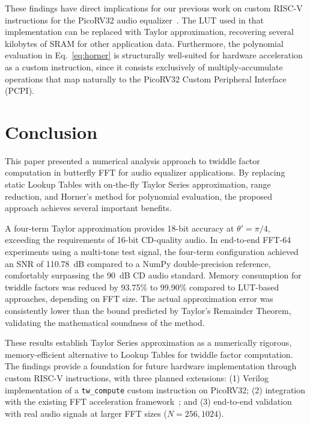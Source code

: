 \documentclass[conference]{IEEEtran}
\begin{document}
These findings have direct implications for our previous work on custom RISC-V
instructions for the PicoRV32 audio equalizer~\cite{qohar2026picorv32}. The
LUT used in that implementation can be replaced with Taylor approximation,
recovering several kilobytes of SRAM for other application data. Furthermore,
the polynomial evaluation in Eq.~\eqref{eq:horner} is structurally well-suited
for hardware acceleration as a custom instruction, since it consists exclusively
of multiply-accumulate operations that map naturally to the PicoRV32 Custom
Peripheral Interface (PCPI).


\section{Conclusion}
\label{sec:conclusion}

This paper presented a numerical analysis approach to twiddle factor computation
in butterfly FFT for audio equalizer applications. By replacing static Lookup
Tables with on-the-fly Taylor Series approximation, range reduction, and
Horner's method for polynomial evaluation, the proposed approach achieves
several important benefits.

A four-term Taylor approximation provides 18-bit accuracy at $\theta' = \pi/4$,
exceeding the requirements of 16-bit CD-quality audio. In end-to-end FFT-64
experiments using a multi-tone test signal, the four-term configuration achieved
an SNR of 110.78~dB compared to a NumPy double-precision reference, comfortably
surpassing the 90~dB CD audio standard. Memory consumption for twiddle factors
was reduced by 93.75\% to 99.90\% compared to LUT-based approaches, depending on
FFT size. The actual approximation error was consistently lower than the bound
predicted by Taylor's Remainder Theorem, validating the mathematical soundness
of the method.

These results establish Taylor Series approximation as a numerically rigorous,
memory-efficient alternative to Lookup Tables for twiddle factor computation.
The findings provide a foundation for future hardware implementation through
custom RISC-V instructions, with three planned extensions: (1) Verilog
implementation of a \texttt{tw\_compute} custom instruction on PicoRV32; (2)
integration with the existing FFT acceleration
framework~\cite{qohar2026picorv32}; and (3) end-to-end validation with real
audio signals at larger FFT sizes ($N = 256, 1024$).
\end{document}
